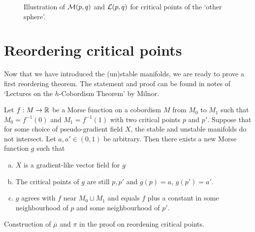\begin{figure}[H]
    \centering
    \caption{
        Illustration of $\mathcal M(p, q)$ and $\mathcal L(p, q)$ for critical points of the `other sphere'.
    }
    \label{fig:mathcal-m-trajectories-other-sphere}
\end{figure}





\filbreak
\section{Reordering critical points}
Now that we have introduced the (un)stable manifolds, we are ready to prove a first reordering theorem. The statement and proof can be found in notes of `Lectures on the $h$-Cobordism Theorem' by Milnor.
\begin{theorem}
    Let $f: M \to  \mathbb{R}$ be a Morse function on a cobordism $M$ from $M_0$ to $M_1$ such that $ M_0 = f^{-1}(0)$ and $ M_1 = f^{-1}(1)$ with two critical points $p$ and  $p'$.
    Suppose that for some choice of pseudo-gradient field $X$, the stable and unstable manifolds do not intersect.
    Let $a, a' \in (0,1)$ be arbitrary.
    Then there exists a new Morse function $g$ such that
    \begin{enumerate}[(a)]
        \item $X$ is a gradient-like vector field for  $g$
        \item The critical points of  $g$ are still $p, p'$ and $g(p) = a$,  $g(p') = a'$.
        \item $g$ agrees with  $f$ near $M_0 \sqcup M_1$ and equals $f$ plus a constant in some neighbourhood of  $p$ and some neighbourhood of  $p'$.
    \end{enumerate}
\end{theorem}
\begin{marginfigure}
    \centering
    \caption{
        Construction of $\overline{\mu}$ and $\pi$ in the proof on reordening critical points.
    }
    \label{fig:reordening-theorem-milnor-h-cobordism}
\end{marginfigure}
